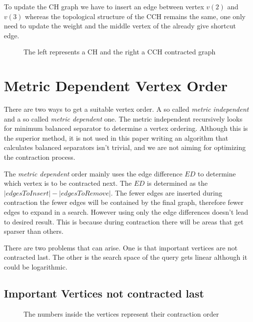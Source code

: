 To update the CH graph we have to insert an edge between vertex $v(2)$ and $v(3)$ whereas the topological structure of the CCH remains the same, one only need to update the weight and the middle vertex of the already give shortcut edge.

\begin{figure}
    \centering
    
    \caption{The left represents a CH and the right a CCH contracted graph}
    \label{fig:DifferenceCHAndCCH}
\end{figure}

\section{Metric Dependent Vertex Order}\label{sec:metric_dependent_vertex_order}
There are two ways to get a suitable vertex order.
A so called \textit{metric independent} and a so called \textit{metric dependent} one.
The metric independent recursively looks for minimum balanced separator to determine a vertex ordering\cite{CCH}.
Although this is the superior method, it is not used in this paper writing an algorithm that calculates balanced separators isn't trivial, and we are not aiming for optimizing the contraction process.

The \textit{metric dependent} order mainly uses the edge difference $ED$ to determine which vertex is to be contracted next.
The $ED$ is determined as the $|edges To Insert| - |edges To Remove|$.
The fewer edges are inserted during contraction the fewer edges will be contained by the final graph, therefore fewer edges to expand in a search.
However using only the edge differences doesn't lead to desired result.
This is because during contraction there will be areas that get sparser than others.

There are two problems that can arise.
One is that important vertices are not contracted last.
The other is the search space of the query gets linear although it could be logarithmic.

\subsection{Important Vertices not contracted last}\label{sec:not_contracted_last}

\begin{figure}
    \centering
    
    \caption{The numbers inside the vertices represent their contraction order}
    \label{fig:not_contracted_last}
\end{figure}

